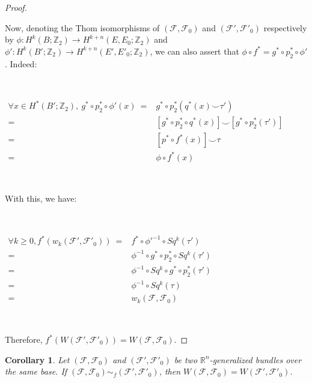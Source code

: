 \documentclass[12pt,oneside]{book}
\newtheorem{cor}    {Corollary}[chapter]
\newcommand{\R}{\mathbb{R}}
\newcommand{\Z}{\mathbb{Z}}
\newcommand{\ccup}{\smile}
\begin{document}
\begin{proof}
        \

        Now, denoting the Thom isomorphisms of $(\mathcal{F},\mathcal{F}_{0})$ and $(\mathcal{F'},\mathcal{F'}_{0})$ 
        respectively by $\phi:H^{k}(B;\Z_{2})\to H^{k+n}(E,E_{0};\Z_{2})$ and $\phi':H^{k}(B';\Z_{2})\to H^{k+n}(E',E'_{0};\Z_{2})$, we can 
        also assert that $\phi\circ f^{*}=g^{*}\circ p_{2}^{*}\circ\phi'$. Indeed:

        \

        $\begin{array}{rl}
        	\forall x\in H^{*}(B';\Z_{2}), \ g^{*}\circ p_{2}^{*}\circ\phi'(x) \ = & g^{*}\circ p_{2}^{*}(q^{*}(x)\ccup \tau') \\
        	= & [g^{*}\circ p_{2}^{*}\circ q^{*}(x)]\ccup [g^{*}\circ p_{2}^{*}(\tau')] \\
        	= & [p^{*}\circ f^{*}(x)]\ccup \tau \\
        	= & \phi\circ f^{*}(x)
        \end{array}$

        \

        With this, we have:

        \

        $\begin{array}{rl}
        	\forall k\geq 0, f^{*}(w_{k}(\mathcal{F'},\mathcal{F'}_{0})) \ = & f^{*}\circ\phi'^{-1}\circ Sq^{k}(\tau') \\
        	= & \phi^{-1}\circ g^{*}\circ p_{2}^{*}\circ Sq^{k}(\tau') \\
        	= & \phi^{-1}\circ Sq^{k}\circ g^{*}\circ p_{2}^{*}(\tau') \\
        	= & \phi^{-1}\circ Sq^{k}(\tau) \\
        	= & w_{k}(\mathcal{F},\mathcal{F}_{0})
        \end{array}$

        \

        Therefore, $f^{*}(W(\mathcal{F'},\mathcal{F'}_{0}))=W(\mathcal{F},\mathcal{F}_{0})$.

    \end{proof}

    \begin{cor}\label{res_SW_fht 3}
	Let $(\mathcal{F},\mathcal{F}_{0})$ and $(\mathcal{F'},\mathcal{F'}_{0})$ be two $\R^{n}$-generalized bundles over the same base. 
    If $(\mathcal{F},\mathcal{F}_{0})\sim_{f} (\mathcal{F'},\mathcal{F'}_{0})$, then 
    $W(\mathcal{F},\mathcal{F}_{0})=W(\mathcal{F'},\mathcal{F'}_{0})$.
    \end{cor}
\end{document}
